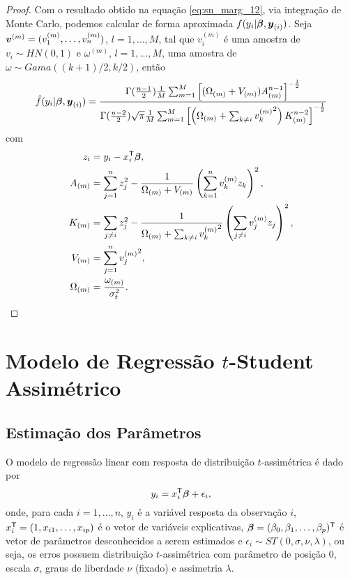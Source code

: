 \begin{proof}
Com o resultado obtido na equação \eqref{eq:sn_marg_12}, via integração de Monte Carlo, podemos calcular de forma aproximada $f(y_i|{\boldsymbol{\beta}},{\boldsymbol{y}_{(i)}})$. Seja ${\boldsymbol{v}}^{(m)} = (v_1^{(m)},\ldots,v_n^{(m)})$, $l=1,\ldots,M$, tal que $v_i^{(m)}$ é uma amostra de $v_i\sim HN(0,1)$ e $\omega^{(m)}$, $l=1,\ldots,M$, uma amostra de $\omega \sim Gama((k+1)/2,k/2)$, então
\begin{equation}
\begin{split}
\hat{f}(y_i|{\boldsymbol{\beta}},{\boldsymbol{y}_{(i)}}) =
\frac{\Gamma(\frac{n-1}{2})\frac{1}{M}\sum_{m=1}^M\left[(\Omega_{(m)}+V_{(m)}) A_{(m)}^{n-1}\right]^{-\frac{1}{2}}}
{\Gamma(\frac{n-2}{2})\sqrt{\pi}\frac{1}{M}\sum_{m=1}^M \left[ \left(\Omega_{(m)} + \sum_{k \neq i}{v_k^{(m)}}^2\right) K_{(m)}^{n-2}\right]^{-\frac{1}{2}}}
\end{split}
\end{equation}
com
\begin{equation}
\begin{split}
z_i & = y_i - x_i^{\mathsf{T}}{\boldsymbol{\beta}}, \\
A_{(m)} & = \sum_{j=1}^nz_j^2 - \frac{1}{\Omega_{(m)} + V_{(m)}}\left(\sum_{k=1}^nv_k^{(m)}z_k\right)^2 ,\\
K_{(m)} & = \sum_{j\neq i}z_j^2-\frac{1}{\Omega_{(m)}+\sum_{k \neq i}{v_k^{(m)}}^2}\left(\sum_{j\neq i}v_j^{(m)}z_j\right)^2 ,\\
V_{(m)} & = \sum_{j=1}^n {v_j^{(m)}}^2 ,\\
\Omega_{(m)} & = \frac{\omega_{(m)}}{\sigma^2_t}.
\end{split}
\end{equation}

\end{proof}

\section{Modelo de Regressão $t$-Student Assimétrico}
\label{sec:reg_t_assim}

\subsection{Estimação dos Parâmetros}

O modelo de regressão linear com resposta de distribuição $t$-assimétrica é dado por
\begin{equation} \label{eq:modelo_skew_t}
y_i = x_i^{\mathsf{T}}{\boldsymbol{\beta}} + \epsilon_i,
\end{equation}
onde, para cada $i=1,\ldots,n$, $y_i$ é a variável resposta da observação $i$, $x_i^{\mathsf{T}}=(1,x_{i1},\ldots,x_{ip})$ é o vetor de variáveis explicativas, ${\boldsymbol{\beta}}=(\beta_0,\beta_1,\ldots,\beta_p)^{\mathsf{T}}$ é vetor de parâmetros desconhecidos a serem estimados e $\epsilon_i\sim ST(0,\sigma,\nu,\lambda)$, ou seja, os erros possuem distribuição $t$-assimétrica com parâmetro de posição $0$, escala $\sigma$, graus de liberdade $\nu$ (fixado) e assimetria $\lambda$.

